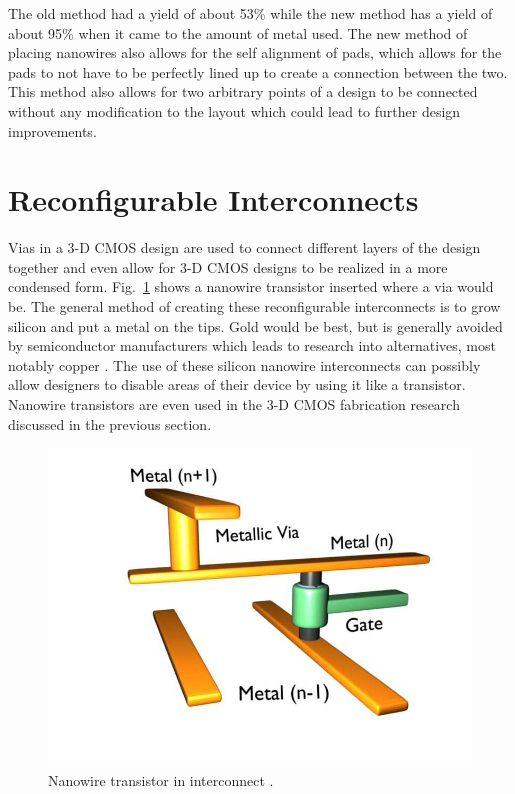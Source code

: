 \documentclass[conference]{IEEEtran}
\begin{document}
The old method had a yield of about 53\% \cite{7968937} while the new method has a yield of about 95\% \cite{8605857}
when it came to the amount of metal used. The new method of placing nanowires also allows for the self alignment of pads, which allows for
the pads to not have to be perfectly lined up to create a connection between the two. This method also allows for two arbitrary points of a
design to be connected without any modification to the layout which could lead to further design improvements.

\section{Reconfigurable Interconnects}
Vias in a 3-D CMOS design are used to connect different layers of the design together and
even allow for 3-D CMOS designs to be realized in a more condensed form. Fig.~\ref{fig:nanowire_transistor}
shows a nanowire transistor inserted where a via would be. The general method of creating these
reconfigurable interconnects is to grow silicon and put a metal on the tips. Gold would be best,
but is generally avoided by semiconductor manufacturers which leads to research into alternatives,
most notably copper \cite{5510748}. The use of these silicon nanowire interconnects can possibly
allow designers to disable areas of their device by using it like a transistor. Nanowire transistors
are even used in the 3-D CMOS fabrication research discussed in the previous section.
\begin{figure}[!htb]
    \centering
    \includegraphics[width=\linewidth]{figures/nanowire_transistor.png}
    \caption{Nanowire transistor in interconnect \cite{5510748}.}\label{fig:nanowire_transistor}
\end{figure}
\end{document}
